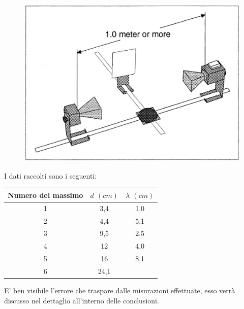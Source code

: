 \begin{figure}[h!]
    \centering
    \includegraphics[scale=.35]{Immagini/loid.png}
    \caption{}
    \label{loyd}
\end{figure}
\noindent
I dati raccolti sono i seguenti:
\begin{table}[h!]
    \centering
    \begin{tabular}{ccc}
        Numero del massimo & $d$ $(cm)$ & $\lambda$ $(cm)$ \\
        \hline 
    1&	3,4&1,0	\\
    2&	4,4&5,1	\\
    3&	9,5&2,5	\\
    4&	12&	   4,0 \\
    5&	16&	    8,1\\
    6&	24,1&	\\
\hline\hline
\end{tabular}
\end{table}

E' ben visibile l'errore che traspare dalle misurazioni effettuate, esso verrà discusso nel dettaglio all'interno delle conclusioni.
